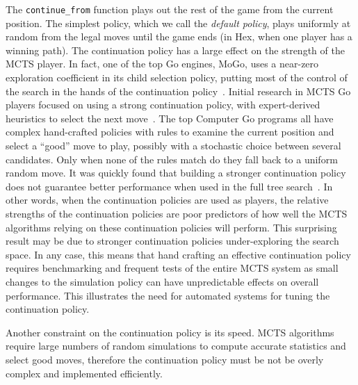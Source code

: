 \documentclass{acm_proc_article-sp}
\begin{document}
The \verb+continue_from+ function plays out the rest of the game from the current position. 
The simplest policy, which we call the \emph{default policy},
 plays uniformly at random from the legal moves until the game ends (in Hex, when one player has a winning path). 
The continuation policy has a large effect on the strength of the MCTS player.
In fact, one of the top Go engines, MoGo, uses a near-zero exploration coefficient in its child selection policy,
putting most of the control of the search in the hands of the continuation policy~\cite{gelly2007combining}.
Initial research in MCTS Go players focused on using a strong continuation policy, with expert-derived heuristics to select the next move~\cite{chaslot2010adding}. 
The top Computer Go programs all have complex hand-crafted policies with rules to examine the current position and select a ``good'' move to play, possibly with a stochastic choice between several candidates. 
Only when none of the rules match do they fall back to a uniform random move. 
It was quickly found that building a stronger continuation policy does not guarantee better performance when used in the full tree search~\cite{gelly2006modification}. 
In other words, when the continuation policies are used as players, the relative strengths of the continuation policies are poor predictors
of how well the MCTS algorithms relying on these continuation policies will perform.
This surprising result may be due to stronger continuation policies under-exploring the search space.
In any case, this means that hand crafting an effective continuation policy requires benchmarking and frequent tests of the entire
MCTS system as small changes to the simulation policy can have unpredictable effects on overall performance.
This illustrates the need for automated systems for tuning the continuation policy.

Another constraint on the continuation policy is its speed.  
MCTS algorithms require large numbers of random simulations to compute accurate statistics and select good moves, therefore the continuation policy must be not be overly complex and implemented efficiently.
\end{document}
